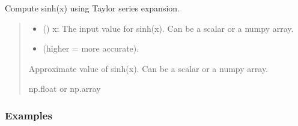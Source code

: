 \documentclass[letterpaper,10pt,english]{sphinxmanual}
\begin{document}
\begin{fulllineitems}
\label{\detokenize{index:ascefunctions.taylors_series.trig_functions.sinh}}
\pysigstartsignatures
\pysiglinewithargsret
{}
{\sphinxparamcomma {}}
{}
\pysigstopsignatures
\sphinxAtStartPar
Compute sinh(x) using Taylor series expansion.
\begin{quote}\begin{description}
\begin{itemize}
\item {} 
\sphinxAtStartPar
{} () \textendash{} x: The input value for sinh(x). Can be a scalar or a numpy array.

\item {} 
\sphinxAtStartPar
{} \textendash{} \begin{description}
\sphinxAtStartPar
(higher = more accurate).

\end{description}


\end{itemize}

\sphinxAtStartPar
Approximate value of sinh(x). Can be a scalar or a numpy array.

\sphinxAtStartPar
np.float or np.array

\end{description}\end{quote}
\subsubsection*{Examples}

\begin{sphinxVerbatim}[commandchars=\\\{\}]
  
\end{sphinxVerbatim}


\end{fulllineitems}
\end{document}
